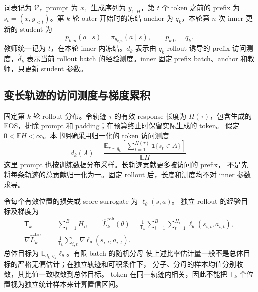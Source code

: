 \documentclass[lang=cn,scheme=chinese,openany]{../book/elegantbook}
\begin{document}
词表记为 $\mathcal V$，prompt 为 $x$，生成序列为 $y_{1:H}$，第 $t$ 个 token 之前的 prefix 为 $s_t=(x,y_{<t})$。第 $k$ 轮 outer 开始时的冻结 anchor 为 $ q_k$，本轮第 $n$ 次 inner 更新的 student 为
\begin{equation}
 p_{k,n}(a\mid s)=\pi_{\theta_{k,n}}(a\mid s),
\qquad  p_{k,0}= q_k.
\end{equation}
教师统一记为 $ t$，在本轮 inner 内冻结。$d_k$ 表示由 $ q_k$ rollout 诱导的 prefix 访问测度，$\widehat d_k$ 表示当前 rollout batch 的经验测度。inner 固定 prefix batch、anchor 和教师，只更新 student 参数。


\subsection{变长轨迹的访问测度与梯度累积}
\label{sec:prefix-measure-reduction}

固定第 $k$ 轮 rollout 分布。令轨迹 $\tau$ 的有效 response 长度为
$H(\tau)$，包含生成的 EOS，排除 prompt 和 padding；在预算终止时保留实际生成的 token。
假定 $0<\mathbb E H<\infty$。本书明确采用归一化的 token 访问测度
\begin{equation}
 d_k(A)=\frac{\mathbb E_{\tau\sim q_k}
 [\sum_{t=1}^{H(\tau)}\mathbf1\{s_t\in A\}]}{\mathbb E H}.
\end{equation}
这里 prompt 也按训练数据分布采样。长轨迹贡献更多被访问的 prefix，
不是先将每条轨迹的总贡献归一化为一。固定 rollout 后，长度和测度均不对 inner 参数求导。

令每个有效位置的损失或 score surrogate 为 $\ell_\theta(s,a)$。
独立 rollout 的经验目标及梯度为
\begin{align}
 \mathsf T_k&=\sum_{i=1}^{B}H_i,\qquad
 \widehat L_k^{\mathrm{tok}}(\theta)
 =\frac1{\mathsf T_k}\sum_{i=1}^{B}\sum_{t=1}^{H_i}
 \ell_\theta(s_{i,t},a_{i,t}),\\
 \nabla\widehat L_k^{\mathrm{tok}}
 &=\frac1{\mathsf T_k}\sum_{i,t}\nabla\ell_\theta(s_{i,t},a_{i,t}).
\end{align}
总体目标为 $\mathbb E_{d_k, q_k}\ell_\theta$。有限 batch 的随机分母
使上述比率估计量一般不是总体目标的严格无偏估计；在独立轨迹和可积条件下，
分子、分母的样本均值分别收敛，其比值一致收敛到总体目标。
token 在同一轨迹内相关，因此不能把 $\mathsf T_k$ 个位置视为独立统计样本来计算置信区间。
\end{document}
